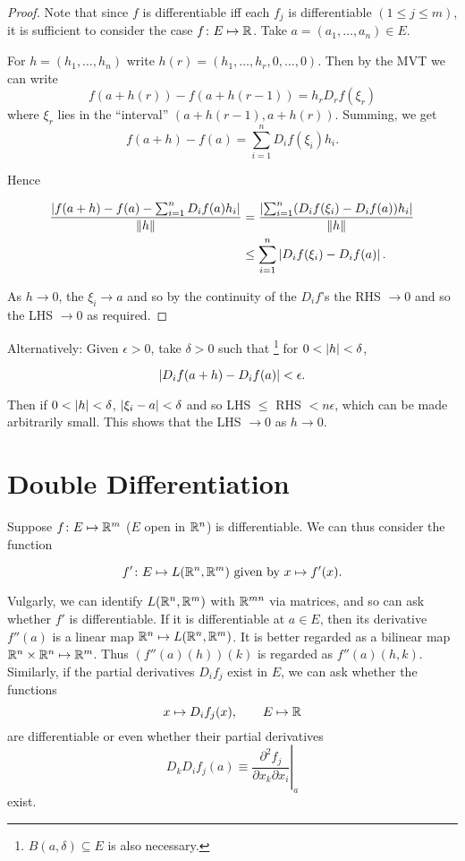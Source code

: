 \documentclass{notes}
\theoremstyle{plain}
\begin{document}
\begin{proof}
Note that since $ f $ is differentiable iff each $ f_{j} $ is 
differentiable $ (1\leq j \leq m) $, it is sufficient to consider 
the case $ f\colon E \mapsto \mathbb{R} $.
Take $ a = (a_{1},\ldots,a_{n}) \in E $.

For $h=(h_{1},\ldots,h_{n})$ write $h(r) = 
(h_{1},\ldots,h_{r},0,\ldots,0)$.
Then by the MVT we can write
\[ f(a+h(r)) - f(a+h(r-1)) = h_{r}D_{r}f(\xi_{r}) \]
where $ \xi_{r} $ lies in the ``interval'' $(a+h(r-1), a+h(r))$.
Summing, we get
\[ f(a+h)-f(a) =  \sum_{i=1}^{n}D_{i}f(\xi_{i})h_{i}. \]

Hence

\begin{align*}
\frac{\left|f(a+h)-f(a) - \sum_{i=1}^{n}D_{i}f(a)h_{i}\right|}{\left\|h\right\|} & =
\frac{\left|\sum_{i=1}^{n}(D_{i}f(\xi_{i})-D_{i}f(a))h_{i}\right|}{\left\|h\right\|} \\
& \leq \sum_{i=1}^{n} \left|D_{i}f(\xi_{i}) - D_{i}f(a)\right|.
\end{align*}

As $ h \to 0 $, the $ \xi_{i}\to a $ and so by the 
continuity of the $ D_{i}f $'s the RHS $ \to 0 $ and so the LHS 
$ \to 0 $ as required.
\end{proof}

Alternatively: Given $ \epsilon>0 $, take $ \delta>0 $ such that%
\footnote{$B(a,\delta) \subseteq E$ is also necessary.}
for $ 0 < \left|h\right| < \delta $,

\[ 
\left|D_{i}f(a+h)-D_{i}f(a)\right|< \epsilon.
\]

Then if $ 0 < \left|h\right| < \delta $, $\left|\xi_{i}-a\right| < \delta $ and so 
LHS $ \leq $ RHS $ < n \epsilon $, which can be made arbitrarily small.
This shows that the LHS $ \to 0 $ as $ h \to 0 $.

\section{Double Differentiation}
Suppose $ f\colon E \mapsto \mathbb{R}^{m} $ ($ E $ open in $ \mathbb{R}^{n} $) is
differentiable.  We can thus consider the function

\[
f'\colon E \mapsto L(\mathbb{R}^{n},\mathbb{R}^{m}) \text{ given by }
x \mapsto f'(x).
\]

Vulgarly, we can identify $ L(\mathbb{R}^{n},\mathbb{R}^{m}) $ with $ \mathbb{R}^{mn} $ 
via matrices, and so can ask whether $ f' $ is differentiable. If 
it is differentiable at $ a \in E $, then its derivative
$ f''(a) $ is a linear map
$\mathbb{R}^{n}\mapsto L(\mathbb{R}^{n},\mathbb{R}^{m})$.
It is better regarded as a bilinear map
${\mathbb{R}^{n} \times \mathbb{R}^{n} \mapsto \mathbb{R}^{m}}$.
Thus $ (f''(a)(h))(k) $ is regarded as $ f''(a)(h,k) $.
Similarly, if the partial derivatives $ D_{i}f_{j} $ exist in $ E 
$, we can ask whether the functions
\[
x \mapsto D_{i}f_{j}(x),  \qquad  E \mapsto \mathbb{R} \]
are differentiable or even whether their partial 
derivatives
\[
D_{k}D_{i}f_{j}(a) \equiv
\left.\frac{\partial^{2}f_{j}}{\partial x_{k}\partial x_{i}}\right|_{a}
\]
exist.
\end{document}
